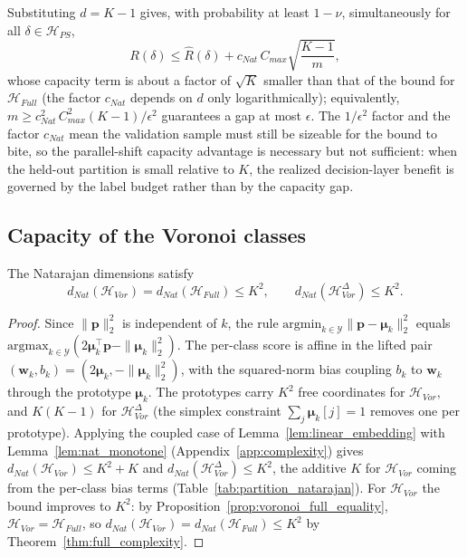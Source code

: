 Substituting $d = K - 1$ gives, with probability at least $1-\nu$, simultaneously for all $\delta \in \mathcal{H}_{PS}$,
\begin{equation}
    R(\delta) \leq \hat{R}(\delta) + c_{Nat}\, C_{max} \sqrt{\frac{K-1}{m}},
\end{equation}
whose capacity term is about a factor of $\sqrt{K}$ smaller than that of the bound for $\mathcal{H}_{Full}$ (the factor $c_{Nat}$ depends on $d$ only logarithmically); equivalently, $m \geq c_{Nat}^2\, C_{max}^2 (K-1)/\epsilon^2$ guarantees a gap at most $\epsilon$. The $1/\epsilon^2$ factor and the factor $c_{Nat}$ mean the validation sample must still be sizeable for the bound to bite, so the parallel-shift capacity advantage is necessary but not sufficient: when the held-out partition is small relative to $K$, the realized decision-layer benefit is governed by the label budget rather than by the capacity gap.

\subsection{Capacity of the Voronoi classes}

\begin{theorem}\label{thm:voronoi_complexity}
    The Natarajan dimensions satisfy
    \begin{equation}
        d_{Nat}(\mathcal{H}_{Vor}) = d_{Nat}(\mathcal{H}_{Full}) \leq K^2, \qquad d_{Nat}(\mathcal{H}_{Vor}^{\Delta}) \leq K^2.
    \end{equation}
\end{theorem}

\begin{proof}
    Since $\|\mathbf{p}\|_2^2$ is independent of $k$, the rule $\mathrm{argmin}_{k \in \mathcal{Y}} \|\mathbf{p} - \boldsymbol{\mu}_k\|_2^2$ equals $\mathrm{argmax}_{k \in \mathcal{Y}} (2\boldsymbol{\mu}_k^\top \mathbf{p} - \|\boldsymbol{\mu}_k\|_2^2)$. The per-class score is affine in the lifted pair $(\mathbf{w}_k, b_k) = (2\boldsymbol{\mu}_k, -\|\boldsymbol{\mu}_k\|_2^2)$, with the squared-norm bias coupling $b_k$ to $\mathbf{w}_k$ through the prototype $\boldsymbol{\mu}_k$. The prototypes carry $K^2$ free coordinates for $\mathcal{H}_{Vor}$, and $K(K-1)$ for $\mathcal{H}_{Vor}^{\Delta}$ (the simplex constraint $\sum_j \boldsymbol{\mu}_k[j] = 1$ removes one per prototype). Applying the coupled case of Lemma~\ref{lem:linear_embedding} with Lemma~\ref{lem:nat_monotone} (Appendix~\ref{app:complexity}) gives $d_{Nat}(\mathcal{H}_{Vor}) \leq K^2 + K$ and $d_{Nat}(\mathcal{H}_{Vor}^{\Delta}) \leq K^2$, the additive $K$ for $\mathcal{H}_{Vor}$ coming from the per-class bias terms (Table~\ref{tab:partition_natarajan}). For $\mathcal{H}_{Vor}$ the bound improves to $K^2$: by Proposition~\ref{prop:voronoi_full_equality}, $\mathcal{H}_{Vor} = \mathcal{H}_{Full}$, so $d_{Nat}(\mathcal{H}_{Vor}) = d_{Nat}(\mathcal{H}_{Full}) \leq K^2$ by Theorem~\ref{thm:full_complexity}.
\end{proof}

